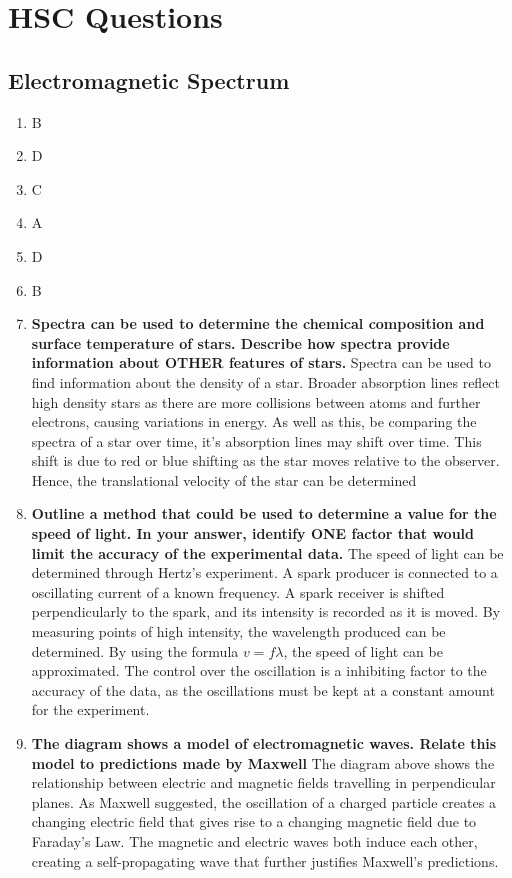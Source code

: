 \documentclass{report}
\begin{document}
\chapter{HSC Questions}

	\section{Electromagnetic Spectrum}

		\begin{enumerate}
			\item B
			\item D
			\item C
			\item A
			\item D
			\item B
			\item \textbf{Spectra can be used to determine the chemical composition and surface temperature of stars. Describe how spectra provide information about OTHER features of stars.}
				\subitem Spectra can be used to find information about the density of a star. Broader absorption lines reflect high density stars as there are more collisions between atoms and further electrons, causing variations in energy. As well as this, be comparing the spectra of a star over time, it's absorption lines may shift over time. This shift is due to red or blue shifting as the star moves relative to the observer. Hence, the translational velocity of the star can be determined

			\item \textbf{Outline a method that could be used to determine a value for the speed of light. In your answer, identify ONE factor that would limit the accuracy of the experimental data.}
				\subitem The speed of light can be determined through Hertz's experiment. A spark producer is connected to a oscillating current of a known frequency. A spark receiver is shifted perpendicularly to the spark, and its intensity is recorded as it is moved. By measuring points of high intensity, the wavelength produced can be determined. By using the formula $v=f \lambda$, the speed of light can be approximated. The control over the oscillation is a inhibiting factor to the accuracy of the data, as the oscillations must be kept at a constant amount for the experiment.

			\item \textbf{The diagram shows a model of electromagnetic waves. Relate this model to predictions made by Maxwell}
				\subitem The diagram above shows the relationship between electric and magnetic fields travelling in perpendicular planes. As Maxwell suggested, the oscillation of a charged particle creates a changing electric field that gives rise to a changing magnetic field due to Faraday's Law. The magnetic and electric waves both induce each other, creating a self-propagating wave that further justifies Maxwell's predictions.


\end{enumerate}
\end{document}
